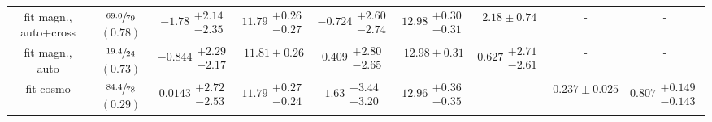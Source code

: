 \documentclass[a4paper,11pt]{article}
\begin{document}
\begin{table}
\begin{center}
\begin{tabular}{ccccccccc}
fit magn., auto+cross & $\sfrac{69.0}{79}$ $(0.78)$ & $-1.78\substack{+2.14 \\ -2.35}$ & $11.79\substack{+0.26 \\ -0.27}$ & $-0.724\substack{+2.60 \\ -2.74}$ & $12.98\substack{+0.30 \\ -0.31}$  & $2.18 \pm 0.74$ & - & - \\
fit magn., auto & $\sfrac{19.4}{24}$ $(0.73)$ & $-0.844\substack{+2.29 \\ -2.17}$ & $11.81 \pm 0.26$ & $0.409\substack{+2.80 \\ -2.65}$ & $12.98 \pm 0.31$  & $0.627\substack{+2.71 \\ -2.61}$ & - & - \\
fit cosmo & $\sfrac{84.4}{78}$ $(0.29)$ & $0.0143\substack{+2.72 \\ -2.53}$ & $11.79\substack{+0.27 \\ -0.24}$ & $1.63\substack{+3.44 \\ -3.20}$ & $12.96\substack{+0.36 \\ -0.35}$  & - & $0.237 \pm 0.025$ & $0.807\substack{+0.149 \\ -0.143}$ \\
 \hline \hline
\end{tabular}
\end{center}
\end{table}
\end{document}
